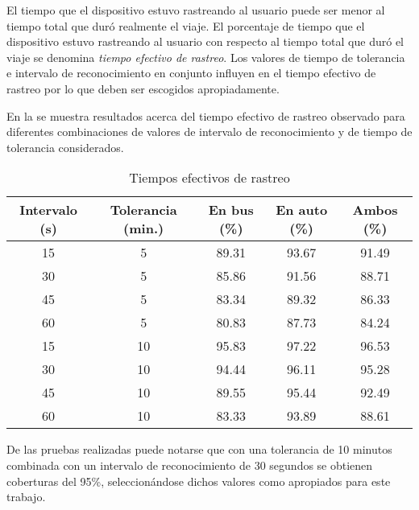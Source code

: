 El tiempo que el dispositivo estuvo rastreando al usuario puede ser menor al tiempo total que duró realmente el viaje. El porcentaje de tiempo que el dispositivo estuvo rastreando al usuario con respecto al tiempo total que duró el viaje se denomina \emph{tiempo efectivo de rastreo}. Los valores de tiempo de tolerancia e intervalo de reconocimiento en conjunto influyen en el tiempo efectivo de rastreo por lo que deben ser escogidos apropiadamente.

En la  se muestra resultados acerca del tiempo efectivo de rastreo observado para diferentes combinaciones de valores de intervalo de reconocimiento y de tiempo de tolerancia considerados. 

\begin{table}[h]
    \centering
	\begin{tabular}{ccccc}
    	\toprule
    	Intervalo (s) & Tolerancia (min.) & En bus (\%) & En auto (\%) & Ambos (\%) \\
    	\midrule
    	15            & 5                 & 89.31         & 93.67          & 91.49        \\
    	30            & 5                 & 85.86         & 91.56          & 88.71        \\
    	45            & 5                 & 83.34         & 89.32          & 86.33        \\
    	60            & 5                 & 80.83         & 87.73          & 84.24        \\
    	15            & 10                & 95.83         & 97.22          & 96.53        \\
    	30            & 10                & 94.44         & 96.11          & 95.28        \\
    	45            & 10                & 89.55         & 95.44          & 92.49        \\
    	60            & 10                & 83.33         & 93.89          & 88.61        \\
    	\bottomrule
	\end{tabular}
    \caption{Tiempos efectivos de rastreo}
    \label{tab:prom_tiempo_efectivo_rastreo}
\end{table}

De las pruebas realizadas puede notarse que con una tolerancia de 10 minutos combinada con un intervalo de reconocimiento de 30 segundos se obtienen coberturas del 95\%, seleccionándose dichos valores como apropiados para este trabajo.

